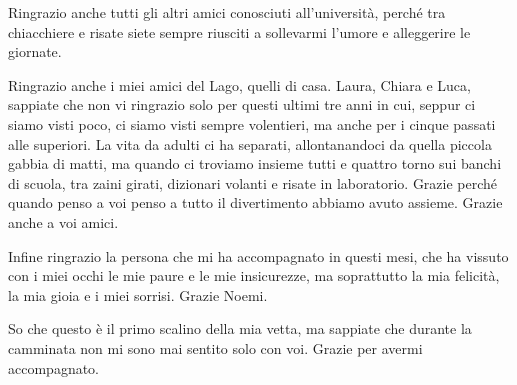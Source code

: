 \begin{dedication}
  Ringrazio anche tutti gli altri amici conosciuti all'università, perché tra chiacchiere e risate siete sempre riusciti a sollevarmi l'umore e alleggerire le giornate.

  Ringrazio anche i miei amici del Lago, quelli di casa. Laura, Chiara e Luca, sappiate che non vi ringrazio solo per questi ultimi tre anni in cui, seppur ci siamo visti poco, ci siamo visti sempre volentieri, ma anche per i cinque passati alle superiori. La vita da adulti ci ha separati, allontanandoci da quella piccola gabbia di matti, ma quando ci troviamo insieme tutti e quattro torno sui banchi di scuola, tra zaini girati, dizionari volanti e risate in laboratorio. Grazie perché quando penso a voi penso a tutto il divertimento abbiamo avuto assieme. Grazie anche a voi amici.
  
  
  Infine ringrazio la persona che mi ha accompagnato in questi mesi, che ha vissuto con i miei occhi le mie paure e le mie insicurezze, ma soprattutto la mia felicità, la mia gioia e i miei sorrisi. Grazie Noemi.
  
  \vspace{2cm}
  
  So che questo è il primo scalino della mia vetta, ma sappiate che durante la camminata non mi sono mai sentito solo con voi. Grazie per avermi accompagnato. 
\end{dedication}
